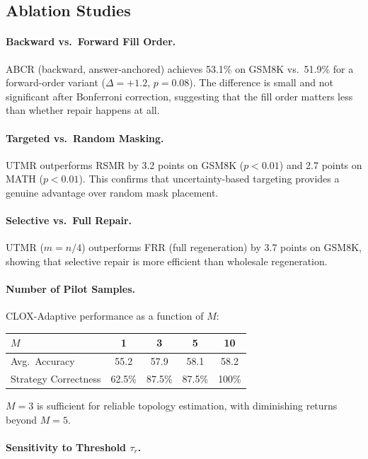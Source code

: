 \documentclass{article}
\begin{document}
\subsection{Ablation Studies}

\paragraph{Backward vs.\ Forward Fill Order.} ABCR (backward, answer-anchored) achieves 53.1\% on GSM8K vs.\ 51.9\% for a forward-order variant ($\Delta = +1.2$, $p = 0.08$). The difference is small and not significant after Bonferroni correction, suggesting that the fill order matters less than whether repair happens at all.

\paragraph{Targeted vs.\ Random Masking.} UTMR outperforms RSMR by 3.2 points on GSM8K ($p < 0.01$) and 2.7 points on MATH ($p < 0.01$). This confirms that uncertainty-based targeting provides a genuine advantage over random mask placement.

\paragraph{Selective vs.\ Full Repair.} UTMR ($m = n/4$) outperforms FRR (full regeneration) by 3.7 points on GSM8K, showing that selective repair is more efficient than wholesale regeneration.

\paragraph{Number of Pilot Samples.} CLOX-Adaptive performance as a function of $M$:

\begin{center}
\small
\begin{tabular}{lcccc}
\toprule
$M$ & 1 & 3 & 5 & 10 \\
\midrule
Avg.\ Accuracy & 55.2 & 57.9 & 58.1 & 58.2 \\
Strategy Correctness & 62.5\% & 87.5\% & 87.5\% & 100\% \\
\bottomrule
\end{tabular}
\end{center}

$M=3$ is sufficient for reliable topology estimation, with diminishing returns beyond $M=5$.

\paragraph{Sensitivity to Threshold $\tau_r$.}
\end{document}
